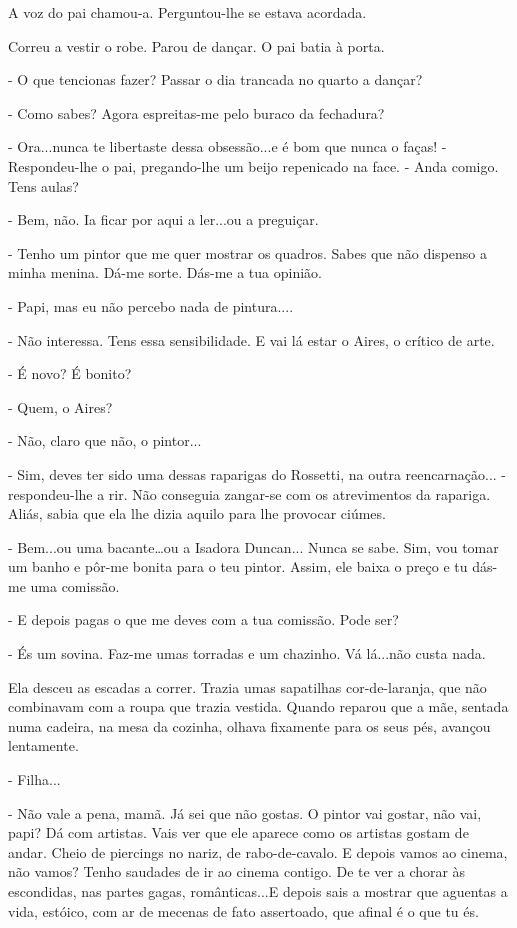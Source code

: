 A voz do pai chamou-a. Perguntou-lhe se estava acordada.

Correu a vestir o robe. Parou de dançar. O pai batia à porta.

- O que tencionas fazer? Passar o dia trancada no quarto a dançar?

- Como sabes? Agora espreitas-me pelo buraco da fechadura?

- Ora...nunca te libertaste dessa obsessão...e é bom que nunca o faças!
- Respondeu-lhe o pai, pregando-lhe um beijo repenicado na face. - Anda
comigo. Tens aulas?

- Bem, não. Ia ficar por aqui a ler...ou a preguiçar.

- Tenho um pintor que me quer mostrar os quadros. Sabes que não dispenso
a minha menina. Dá-me sorte. Dás-me a tua opinião.

- Papi, mas eu não percebo nada de pintura....

- Não interessa. Tens essa sensibilidade. E vai lá estar o Aires, o
crítico de arte.

- É novo? É bonito?

- Quem, o Aires?

- Não, claro que não, o pintor...

- Sim, deves ter sido uma dessas raparigas do Rossetti, na outra
reencarnação... - respondeu-lhe a rir. Não conseguia zangar-se com os
atrevimentos da rapariga. Aliás, sabia que ela lhe dizia aquilo para lhe
provocar ciúmes.

- Bem...ou uma bacante\ldots{}ou a Isadora Duncan... Nunca se sabe. Sim,
vou tomar um banho e pôr-me bonita para o teu pintor. Assim, ele baixa o
preço e tu dás-me uma comissão.

- E depois pagas o que me deves com a tua comissão. Pode ser?

- És um sovina. Faz-me umas torradas e um chazinho. Vá lá...não custa
nada.

Ela desceu as escadas a correr. Trazia umas sapatilhas cor-de-laranja,
que não combinavam com a roupa que trazia vestida. Quando reparou que a
mãe, sentada numa cadeira, na mesa da cozinha, olhava fixamente para os
seus pés, avançou lentamente.

- Filha...

- Não vale a pena, mamã. Já sei que não gostas. O pintor vai gostar, não
vai, papi? Dá com artistas. Vais ver que ele aparece como os artistas
gostam de andar. Cheio de piercings no nariz, de rabo-de-cavalo. E
depois vamos ao cinema, não vamos? Tenho saudades de ir ao cinema
contigo. De te ver a chorar às escondidas, nas partes gagas,
românticas...E depois sais a mostrar que aguentas a vida, estóico, com
ar de mecenas de fato assertoado, que afinal é o que tu és.

